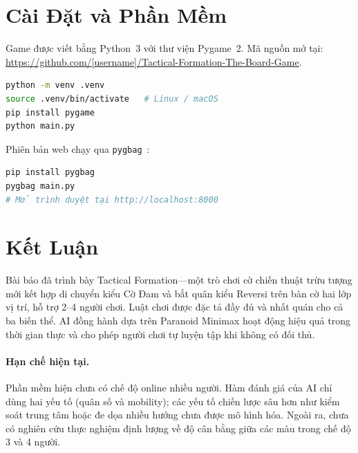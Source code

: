 \documentclass[12pt, a4paper]{article}
\begin{document}
\section{Cài Đặt và Phần Mềm}
\label{sec:impl}

Game được viết bằng Python~3 với thư viện Pygame~2. Mã nguồn mở tại:
\url{https://github.com/[username]/Tactical-Formation-The-Board-Game}.

\begin{lstlisting}[language=bash, caption={Cài đặt và chạy game.}]
python -m venv .venv
source .venv/bin/activate   # Linux / macOS
pip install pygame
python main.py
\end{lstlisting}

Phiên bản web chạy qua \texttt{pygbag}~\cite{pygbag}:
\begin{lstlisting}[language=bash, caption={Chạy trên trình duyệt.}]
pip install pygbag
pygbag main.py
# Mở trình duyệt tại http://localhost:8000
\end{lstlisting}

\section{Kết Luận}
\label{sec:conclusion}

Bài báo đã trình bày Tactical Formation---một trò chơi cờ chiến thuật
trừu tượng mới kết hợp di chuyển kiểu Cờ Đam và bắt quân kiểu Reversi
trên bàn cờ hai lớp vị trí, hỗ trợ 2--4 người chơi. Luật chơi được
đặc tả đầy đủ và nhất quán cho cả ba biến thể. AI đồng hành dựa trên
Paranoid Minimax hoạt động hiệu quả trong thời gian thực và cho phép
người chơi tự luyện tập khi không có đối thủ.

\paragraph{Hạn chế hiện tại.}
Phần mềm hiện chưa có chế độ online nhiều người. Hàm đánh giá của AI
chỉ dùng hai yếu tố (quân số và mobility); các yếu tố chiến lược sâu hơn
như kiểm soát trung tâm hoặc đe dọa nhiều hướng chưa được mô hình hóa.
Ngoài ra, chưa có nghiên cứu thực nghiệm định lượng về độ cân bằng giữa
các màu trong chế độ 3 và 4 người.
\end{document}

